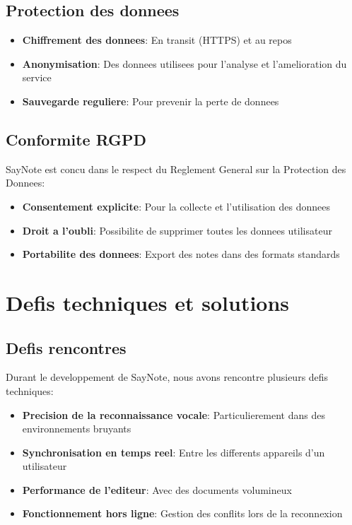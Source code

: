 \subsection{Protection des donnees}
\begin{itemize}
    \item \textbf{Chiffrement des donnees}: En transit (HTTPS) et au repos
    \item \textbf{Anonymisation}: Des donnees utilisees pour l'analyse et l'amelioration du service
    \item \textbf{Sauvegarde reguliere}: Pour prevenir la perte de donnees
\end{itemize}

\subsection{Conformite RGPD}
SayNote est concu dans le respect du Reglement General sur la Protection des Donnees:
\begin{itemize}
    \item \textbf{Consentement explicite}: Pour la collecte et l'utilisation des donnees
    \item \textbf{Droit a l'oubli}: Possibilite de supprimer toutes les donnees utilisateur
    \item \textbf{Portabilite des donnees}: Export des notes dans des formats standards
\end{itemize}

\section{Defis techniques et solutions}
\subsection{Defis rencontres}
Durant le developpement de SayNote, nous avons rencontre plusieurs defis techniques:
\begin{itemize}
    \item \textbf{Precision de la reconnaissance vocale}: Particulierement dans des environnements bruyants
    \item \textbf{Synchronisation en temps reel}: Entre les differents appareils d'un utilisateur
    \item \textbf{Performance de l'editeur}: Avec des documents volumineux
    \item \textbf{Fonctionnement hors ligne}: Gestion des conflits lors de la reconnexion
\end{itemize}

